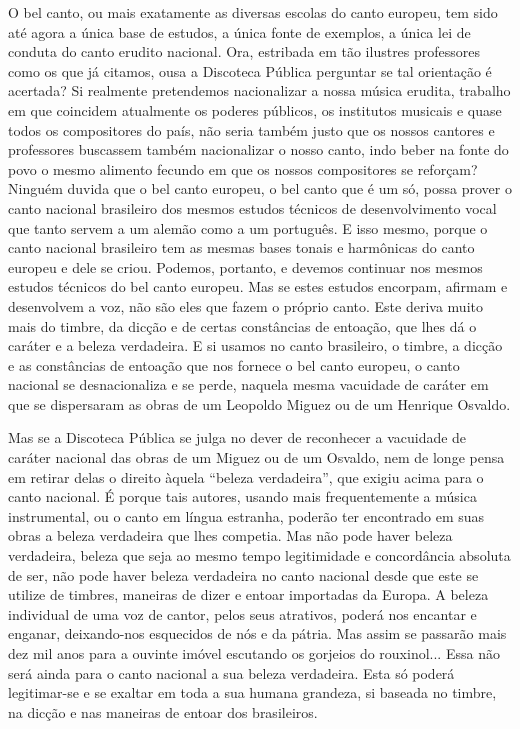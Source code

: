 O bel canto, ou mais exatamente as diversas escolas do canto europeu,
tem sido até agora a única base de estudos, a única fonte de exemplos, a
única lei de conduta do canto erudito nacional. Ora, estribada em tão
ilustres professores como os que já citamos, ousa a Discoteca Pública
perguntar se tal orientação é acertada? Si realmente pretendemos
nacionalizar a nossa música erudita, trabalho em que coincidem
atualmente os poderes públicos, os institutos musicais e quase todos os
compositores do país, não seria também justo que os nossos cantores e
professores buscassem também nacionalizar o nosso canto, indo beber na
fonte do povo o mesmo alimento fecundo em que os nossos compositores se
reforçam? Ninguém duvida que o bel canto europeu, o bel canto que é um
só, possa prover o canto nacional brasileiro dos mesmos estudos técnicos
de desenvolvimento vocal que tanto servem a um alemão como a um
português. E isso mesmo, porque o canto nacional brasileiro tem as
mesmas bases tonais e harmônicas do canto europeu e dele se criou.
Podemos, portanto, e devemos continuar nos mesmos estudos técnicos do
bel canto europeu. Mas se estes estudos encorpam, afirmam e desenvolvem
a voz, não são eles que fazem o próprio canto. Este deriva muito mais do
timbre, da dicção e de certas constâncias de entoação, que lhes dá o
caráter e a beleza verdadeira. E si usamos no canto brasileiro, o
timbre, a dicção e as constâncias de entoação que nos fornece o bel
canto europeu, o canto nacional se desnacionaliza e se perde, naquela
mesma vacuidade de caráter em que se dispersaram as obras de um Leopoldo
Miguez ou de um Henrique Osvaldo.

Mas se a Discoteca Pública se julga no dever de reconhecer a vacuidade
de caráter nacional das obras de um Miguez ou de um Osvaldo, nem de
longe pensa em retirar delas o direito àquela ``beleza verdadeira'', que
exigiu acima para o canto nacional. É porque tais autores, usando mais
frequentemente a música instrumental, ou o canto em língua estranha,
poderão ter encontrado em suas obras a beleza verdadeira que lhes
competia. Mas não pode haver beleza verdadeira, beleza que seja ao mesmo
tempo legitimidade e concordância absoluta de ser, não pode haver beleza
verdadeira no canto nacional desde que este se utilize de timbres,
maneiras de dizer e entoar importadas da Europa. A beleza individual de
uma voz de cantor, pelos seus atrativos, poderá nos encantar e enganar,
deixando-nos esquecidos de nós e da pátria. Mas assim se passarão mais
dez mil anos para a ouvinte imóvel escutando os gorjeios do rouxinol...
Essa não será ainda para o canto nacional a sua beleza verdadeira. Esta
só poderá legitimar-se e se exaltar em toda a sua humana grandeza, si
baseada no timbre, na dicção e nas maneiras de entoar dos brasileiros.

